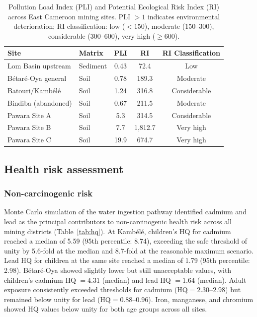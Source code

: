 \documentclass[preprint,12pt,authoryear]{elsarticle}
\begin{document}
\begin{table}[h!]
\centering
\caption{Pollution Load Index (PLI) and Potential Ecological Risk Index (RI) across East Cameroon mining sites. PLI $> 1$ indicates environmental deterioration; RI classification: low ($<150$), moderate ($150$--$300$), considerable ($300$--$600$), very high ($\geq 600$).}
\label{tab:pli_ri}
\small
\begin{tabular}{llccc}
\toprule
Site & Matrix & PLI & RI & RI Classification \\
\midrule
Lom Basin upstream & Sediment & 0.43 & 72.4 & Low \\
B\'{e}tar\'{e}-Oya general & Soil & 0.78 & 189.3 & Moderate \\
Batouri/Kamb\'{e}l\'{e} & Soil & 1.24 & 316.8 & Considerable \\
Bindiba (abandoned) & Soil & 0.67 & 211.5 & Moderate \\
Pawara Site A & Soil & 5.3 & 314.5 & Considerable \\
Pawara Site B & Soil & 7.7 & 1,812.7 & Very high \\
Pawara Site C & Soil & 19.9 & 674.7 & Very high \\
\bottomrule
\end{tabular}
\end{table}


\subsection{Health risk assessment}

\subsubsection{Non-carcinogenic risk}

Monte Carlo simulation of the water ingestion pathway identified cadmium and lead as the principal contributors to non-carcinogenic health risk across all mining districts (Table~\ref{tab:hq}). At Kamb\'{e}l\'{e}, children's HQ for cadmium reached a median of 5.59 (95th percentile: 8.74), exceeding the safe threshold of unity by 5.6-fold at the median and 8.7-fold at the reasonable maximum scenario. Lead HQ for children at the same site reached a median of 1.79 (95th percentile: 2.98). B\'{e}tar\'{e}-Oya showed slightly lower but still unacceptable values, with children's cadmium HQ $= 4.31$ (median) and lead HQ $= 1.64$ (median). Adult exposure consistently exceeded thresholds for cadmium ($\text{HQ} = 2.30$--$2.98$) but remained below unity for lead ($\text{HQ} = 0.88$--$0.96$). Iron, manganese, and chromium showed HQ values below unity for both age groups across all sites.
\end{document}
